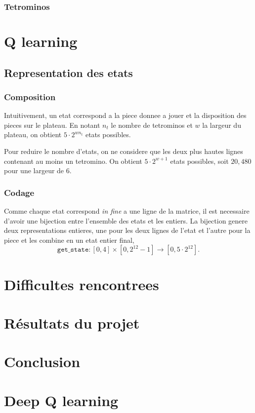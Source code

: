 \documentclass{article}
\begin{document}
\subsubsection{Tetrominos}

\section{Q learning}

\subsection{Representation des etats}
\subsubsection{Composition}
Intuitivement, un etat correspond a la piece donnee a jouer et la disposition
des pieces sur le plateau. En notant \(n_t\) le nombre de tetrominos et \(w\) la
largeur du plateau, on obtient \(5 \cdot 2^{wn_t}\) etats possibles.

Pour reduire le nombre d'etats, on ne considere que les deux plus hautes lignes
contenant au moins un tetromino. On obtient \(5\cdot 2^{w+1}\) etats possibles,
soit \(20,480\) pour une largeur de 6.

\subsubsection{Codage}
Comme chaque etat correspond \textit{in fine} a une ligne de la matrice, il est
necessaire d'avoir une bijection entre l'ensemble des etats et les entiers. La
bijection genere deux representations entieres, une pour les deux lignes de
l'etat et l'autre pour la piece et les combine en un etat entier final,
\[
  \texttt{get\_state}\colon [0,4]\times [0, 2^{12} - 1] \to [0, 5\cdot 2^{12}].
\]

\section{Difficultes rencontrees}

\section{R\'esultats du projet}

\section*{Conclusion}

\appendix
\section{Deep Q learning}
\end{document}
